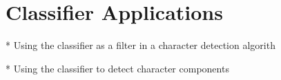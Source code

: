 \chapter{Classifier Applications}
* Using the classifier as a filter in a character detection algorith

* Using the classifier to detect character components

